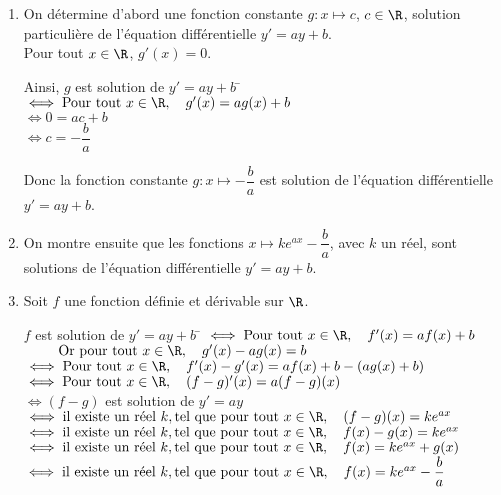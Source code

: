 \documentclass[a4paper,11pt,cours]{nsi} %
\begin{document}
\begin{demonstration}
    \begin{enumerate}[label=\textbullet]
        \item On détermine d'abord une fonction constante $g:x\mapsto c$, $c\in\R$, solution particulière de l'équation différentielle $y'=ay+b$.\\
        Pour tout $x\in\R$, $g'(x)=0$.
        \begin{tabbing}
            Ainsi, $g$ est solution de $y'=ay+b$ \= $\iff \text{Pour tout }x\in\R,\quad g'(x)=ag(x)+b$\\
            \> $\iff 0=ac+b$\\
            \> $\iff c=-\dfrac{b}{a}$
        \end{tabbing}
        Donc la fonction constante $g:x\mapsto -\dfrac{b}{a}$ est solution de l'équation différentielle $y'=ay+b$.
        \item On montre ensuite que les fonctions $x\mapsto ke^{ax}-\dfrac{b}{a}$, avec $k$ un réel, sont solutions de l'équation différentielle $y'=ay+b$.\\
        \item Soit $f$ une fonction définie et dérivable sur $\R$.
        \begin{tabbing}
            $f$ est solution de $y'=ay+b$ \= $\iff \text{Pour tout }x\in\R,\quad f'(x)=af(x)+b$\\
            \> $\phantom{\iff } \text{Or pour tout }x\in\R,\quad g'(x)-ag(x)=b$\\
            \> $\iff \text{Pour tout }x\in\R,\quad f'(x)-g'(x)=af(x)+b-(ag(x)+b)$\\
            \> $\iff \text{Pour tout }x\in\R,\quad (f-g)'(x)=a(f-g)(x)$\\
            \> $\iff (f-g)$ est solution de $y'=ay$\\
            \> $\iff \text{il existe un réel } k, \text{tel que pour tout } x\in\R,\quad (f-g)(x)=ke^{ax}$\\
            \> $\iff \text{il existe un réel } k, \text{tel que pour tout } x\in\R,\quad f(x)-g(x)=ke^{ax}$\\
            \> $\iff \text{il existe un réel } k, \text{tel que pour tout } x\in\R,\quad f(x)=ke^{ax}+g(x)$\\
            \> $\iff \text{il existe un réel } k, \text{tel que pour tout } x\in\R,\quad f(x)=ke^{ax}-\dfrac{b}{a}$
        \end{tabbing}
    \end{enumerate}
\end{demonstration}
\end{document}
